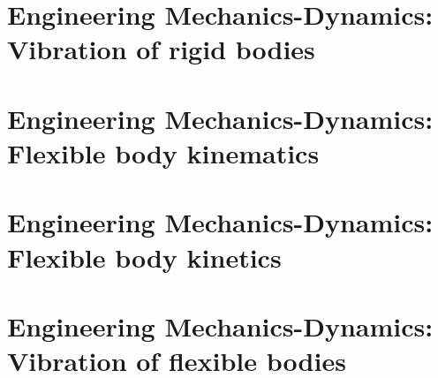 \documentclass[]{book}
\begin{document}
\part{Engineering Mechanics-Dynamics: Vibration of rigid bodies}
\part{Engineering Mechanics-Dynamics: Flexible body kinematics}
\part{Engineering Mechanics-Dynamics: Flexible body kinetics}
\part{Engineering Mechanics-Dynamics: Vibration of flexible bodies}
\appendix

\backmatter

\printindex
\end{document}
